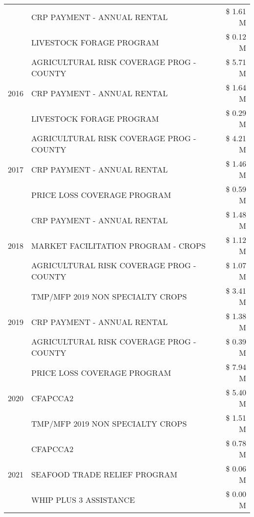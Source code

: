 \begin{tabular}{llr}
 & CRP PAYMENT - ANNUAL RENTAL & \$ 1.61 M \\
 & LIVESTOCK FORAGE PROGRAM & \$ 0.12 M \\
\cline{1-3}
\multirow[t]{3}{*}{2016} & AGRICULTURAL RISK COVERAGE PROG - COUNTY & \$ 5.71 M \\
 & CRP PAYMENT - ANNUAL RENTAL & \$ 1.64 M \\
 & LIVESTOCK FORAGE PROGRAM & \$ 0.29 M \\
\cline{1-3}
\multirow[t]{3}{*}{2017} & AGRICULTURAL RISK COVERAGE PROG - COUNTY & \$ 4.21 M \\
 & CRP PAYMENT - ANNUAL RENTAL & \$ 1.46 M \\
 & PRICE LOSS COVERAGE PROGRAM & \$ 0.59 M \\
\cline{1-3}
\multirow[t]{3}{*}{2018} & CRP PAYMENT - ANNUAL RENTAL & \$ 1.48 M \\
 & MARKET FACILITATION PROGRAM - CROPS & \$ 1.12 M \\
 & AGRICULTURAL RISK COVERAGE PROG - COUNTY & \$ 1.07 M \\
\cline{1-3}
\multirow[t]{3}{*}{2019} & TMP/MFP 2019 NON SPECIALTY CROPS & \$ 3.41 M \\
 & CRP PAYMENT - ANNUAL RENTAL & \$ 1.38 M \\
 & AGRICULTURAL RISK COVERAGE PROG - COUNTY & \$ 0.39 M \\
\cline{1-3}
\multirow[t]{3}{*}{2020} & PRICE LOSS COVERAGE PROGRAM & \$ 7.94 M \\
 & CFAPCCA2 & \$ 5.40 M \\
 & TMP/MFP 2019 NON SPECIALTY CROPS & \$ 1.51 M \\
\cline{1-3}
\multirow[t]{3}{*}{2021} & CFAPCCA2 & \$ 0.78 M \\
 & SEAFOOD TRADE RELIEF PROGRAM & \$ 0.06 M \\
 & WHIP PLUS 3 ASSISTANCE & \$ 0.00 M \\
\cline{1-3}
\bottomrule
\end{tabular}
